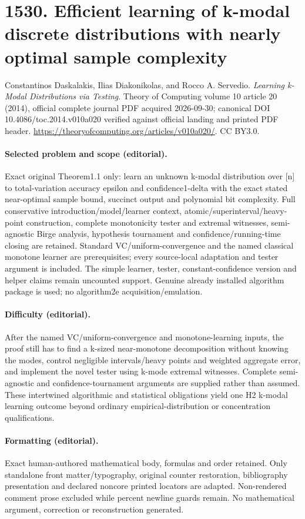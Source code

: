 \documentclass[10pt]{article}
\theoremstyle{definition}
\numberwithin{equation}{section}
\begin{document}
\section*{1530. Efficient learning of k-modal discrete distributions with nearly optimal sample complexity}
Constantinos Daskalakis, Ilias Diakonikolas, and Rocco A. Servedio. \emph{Learning k-Modal Distributions via Testing}. Theory of Computing volume 10 article 20 (2014), official complete journal PDF acquired 2026-09-30; canonical DOI 10.4086/toc.2014.v010a020 verified against official landing and printed PDF header. \url{https://theoryofcomputing.org/articles/v010a020/}. CC BY3.0.
\paragraph{Selected problem and scope (editorial).} Exact original Theorem1.1 only: learn an unknown k-modal distribution over [n] to total-variation accuracy epsilon and confidence1-delta with the exact stated near-optimal sample bound, succinct output and polynomial bit complexity. Full conservative introduction/model/learner context, atomic/superinterval/heavy-point construction, complete monotonicity tester and extremal witnesses, semi-agnostic Birge analysis, hypothesis tournament and confidence/running-time closing are retained. Standard VC/uniform-convergence and the named classical monotone learner are prerequisites; every source-local adaptation and tester argument is included. The simple learner, tester, constant-confidence version and helper claims remain uncounted support. Genuine already installed algorithm package is used; no algorithm2e acquisition/emulation.
\paragraph{Difficulty (editorial).} After the named VC/uniform-convergence and monotone-learning inputs, the proof still has to find a k-sized near-monotone decomposition without knowing the modes, control negligible intervals/heavy points and weighted aggregate error, and implement the novel tester using k-mode extremal witnesses. Complete semi-agnostic and confidence-tournament arguments are supplied rather than assumed. These intertwined algorithmic and statistical obligations yield one H2 k-modal learning outcome beyond ordinary empirical-distribution or concentration qualifications.
\paragraph{Formatting (editorial).} Exact human-authored mathematical body, formulas and order retained. Only standalone front matter/typography, original counter restoration, bibliography presentation and declared noncore printed locators are adapted. Non-rendered comment prose excluded while percent newline guards remain. No mathematical argument, correction or reconstruction generated.
\end{document}
